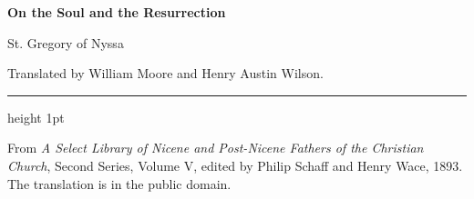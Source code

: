 \documentclass[11pt,letterpaper]{article}
\begin{document}
\color{ink}

\begin{center}
{\LARGE\bfseries\color{heading} On the Soul and the Resurrection\par}
\vspace{1.2em}
{\large St. Gregory of Nyssa\par}
\vspace{0.6em}
{Translated by William Moore and Henry Austin Wilson.\par}
\vspace{0.4em}
{\color{accent}\hrule height 1pt}
\end{center}
\vspace{1em}



\vspace{2em}
{\small\noindent From \emph{A Select Library of Nicene and Post-Nicene Fathers
of the Christian Church}, Second Series, Volume V, edited by Philip Schaff
and Henry Wace, 1893. The translation is in the public domain.\par}
\end{document}
